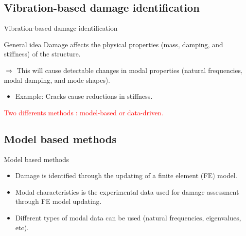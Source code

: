 \documentclass{beamer}
\begin{document}
\subsection{Vibration-based damage identification}
\begin{frame}{Vibration-based damage identification}
\begin{block}{General idea}
	Damage affects the physical properties (mass, damping, and stiffness) of the structure.\newline 
	
	$\Rightarrow$ This will cause detectable changes in modal properties (natural frequencies, modal damping, and mode shapes).
\end{block}
\begin{itemize}
\item Example: Cracks cause reductions in stiffness.
\end{itemize}
\vspace{0.5\baselineskip}
\begin{center}
\textcolor{red}{{\large Two differents methods : model-based or data-driven.}}
\end{center}
\end{frame}

\subsection{Model based methods}
\begin{frame}{Model based methods}
\begin{center}
\begin{itemize}
\item Damage is identified through the updating of a finite element (FE) model.

\vspace{1\baselineskip}
\item Modal characteristics is the experimental data used for damage
assessment through FE model updating.
\vspace{1\baselineskip}
\item Different types of modal data can be used (natural frequencies, eigenvalues, etc).
\end{itemize}
\end{center}
\end{frame}
\end{document}
